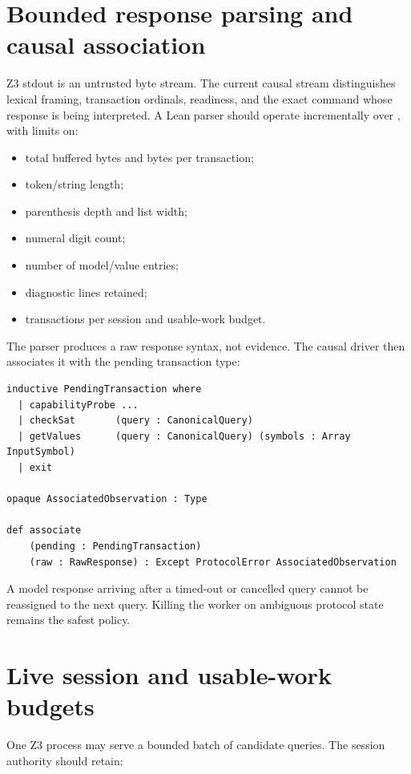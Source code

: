 \documentclass[10pt,letterpaper,oneside]{report}
\newcommand{\code}[1]{\texttt{\detokenize{#1}}}
\begin{document}
\section{Bounded response parsing and causal association}

Z3 stdout is an untrusted byte stream. The current causal stream distinguishes lexical framing, transaction ordinals, readiness, and the exact command whose response is being interpreted. A Lean parser should operate incrementally over \code{ByteArray}, with limits on:

\begin{itemize}
  \item total buffered bytes and bytes per transaction;
  \item token/string length;
  \item parenthesis depth and list width;
  \item numeral digit count;
  \item number of model/value entries;
  \item diagnostic lines retained;
  \item transactions per session and usable-work budget.
\end{itemize}

The parser produces a raw response syntax, not evidence. The causal driver then associates it with the pending transaction type:

\begin{lstlisting}[language=Leanish]
inductive PendingTransaction where
  | capabilityProbe ...
  | checkSat       (query : CanonicalQuery)
  | getValues      (query : CanonicalQuery) (symbols : Array InputSymbol)
  | exit

opaque AssociatedObservation : Type

def associate
    (pending : PendingTransaction)
    (raw : RawResponse) : Except ProtocolError AssociatedObservation
\end{lstlisting}

A model response arriving after a timed-out or cancelled query cannot be reassigned to the next query. Killing the worker on ambiguous protocol state remains the safest policy.

\section{Live session and usable-work budgets}

One Z3 process may serve a bounded batch of candidate queries. The session authority should retain:
\end{document}
